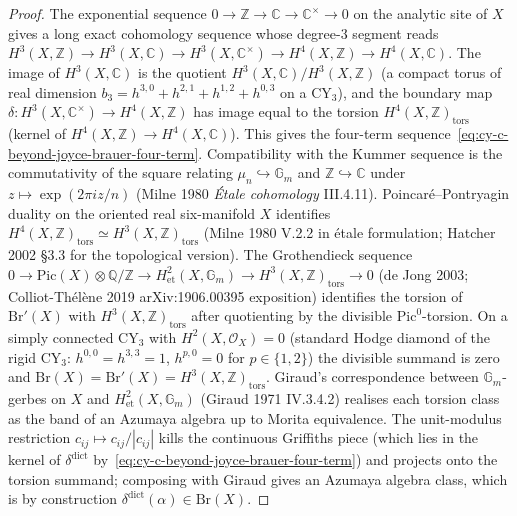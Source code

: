 \begin{proof}
The exponential sequence
$0 \to \mathbb{Z} \to \mathbb{C} \to \mathbb{C}^\times \to 0$ on the
analytic site of $X$ gives a long exact cohomology sequence whose degree-$3$
segment reads
$H^3(X, \mathbb{Z}) \to H^3(X, \mathbb{C}) \to H^3(X, \mathbb{C}^\times) \to H^4(X, \mathbb{Z}) \to H^4(X, \mathbb{C})$.
The image of $H^3(X, \mathbb{C})$ is the quotient
$H^3(X, \mathbb{C}) / H^3(X, \mathbb{Z})$ (a compact torus of real dimension
$b_3 = h^{3,0} + h^{2,1} + h^{1,2} + h^{0,3}$ on a CY$_3$), and the boundary
map $\delta : H^3(X, \mathbb{C}^\times) \to H^4(X, \mathbb{Z})$ has image
equal to the torsion $H^4(X, \mathbb{Z})_{\mathrm{tors}}$ (kernel of
$H^4(X, \mathbb{Z}) \to H^4(X, \mathbb{C})$). This gives the four-term
sequence~\eqref{eq:cy-c-beyond-joyce-brauer-four-term}. Compatibility with
the Kummer sequence is the commutativity of the square relating
$\mu_n \hookrightarrow \mathbb{G}_m$ and $\mathbb{Z} \hookrightarrow \mathbb{C}$
under $z \mapsto \exp(2\pi i z / n)$ (Milne 1980 \emph{\'Etale cohomology}
III.4.11). Poincaré--Pontryagin duality on the oriented
real six-manifold $X$ identifies
$H^4(X, \mathbb{Z})_{\mathrm{tors}} \simeq H^3(X, \mathbb{Z})_{\mathrm{tors}}$
(Milne 1980 V.2.2 in \'etale formulation; Hatcher 2002 \S 3.3 for the
topological version). The Grothendieck sequence
$0 \to \mathrm{Pic}(X) \otimes \mathbb{Q}/\mathbb{Z} \to H^2_{\mathrm{et}}(X, \mathbb{G}_m)
\to H^3(X, \mathbb{Z})_{\mathrm{tors}} \to 0$
(de Jong 2003; Colliot-Th\'el\`ene 2019 arXiv:1906.00395 exposition)
identifies the torsion of $\mathrm{Br}'(X)$ with
$H^3(X, \mathbb{Z})_{\mathrm{tors}}$ after quotienting by the divisible
$\mathrm{Pic}^0$-torsion. On a simply connected CY$_3$ with
$H^2(X, \mathcal{O}_X) = 0$ (standard Hodge diamond of the rigid CY$_3$:
$h^{0,0} = h^{3,3} = 1$, $h^{p,0} = 0$ for $p \in \{1, 2\}$) the divisible
summand is zero and $\mathrm{Br}(X) = \mathrm{Br}'(X) = H^3(X, \mathbb{Z})_{\mathrm{tors}}$.
Giraud's correspondence between $\mathbb{G}_m$-gerbes on $X$ and
$H^2_{\mathrm{et}}(X, \mathbb{G}_m)$ (Giraud 1971 IV.3.4.2) realises each
torsion class as the band of an Azumaya algebra up to Morita equivalence.
The unit-modulus restriction $c_{ij} \mapsto c_{ij}/|c_{ij}|$ kills the
continuous Griffiths piece (which lies in the kernel of $\delta^{\mathrm{dict}}$
by~\eqref{eq:cy-c-beyond-joyce-brauer-four-term}) and projects onto the
torsion summand; composing with Giraud gives an Azumaya algebra class,
which is by construction $\delta^{\mathrm{dict}}(\alpha) \in \mathrm{Br}(X)$.
\end{proof}

